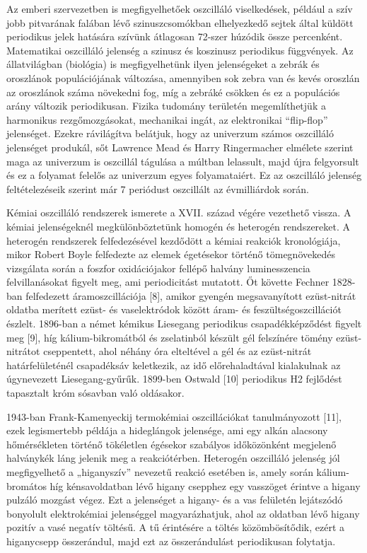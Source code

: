 Az emberi szervezetben is megfigyelhetőek oszcilláló viselkedések, például a szív jobb pitvarának falában lévő szinuszcsomókban elhelyezkedő sejtek által küldött periodikus jelek hatására  szívünk átlagosan 72-szer húzódik össze percenként. Matematikai oszcilláló jelenség a szinusz és koszinusz periodikus függvények. Az állatvilágban (biológia) is megfigyelhetünk ilyen jelenségeket a zebrák és oroszlánok populációjának változása, amennyiben sok zebra van és kevés oroszlán az oroszlánok száma növekedni fog, míg a zebráké csökken és ez a populációs arány változik periodikusan. Fizika tudomány területén megemlíthetjük a harmonikus rezgőmozgásokat, mechanikai ingát,  az elektronikai “flip-flop” jelenséget. Ezekre rávilágítva belátjuk, hogy az univerzum számos oszcilláló jelenséget produkál, sőt Lawrence Mead és Harry Ringermacher elmélete \cite{ringermacher2017strong}  szerint maga az univerzum is oszcillál tágulása a múltban lelassult, majd újra felgyorsult és ez a folyamat felelős az univerzum egyes folyamataiért. Ez az oszcilláló jelenség feltételezéseik szerint már 7 periódust oszcillált az évmilliárdok során.

Kémiai oszcilláló rendszerek ismerete a XVII. század végére vezethető vissza. A kémiai jelenségeknél megkülönböztetünk homogén és heterogén rendszereket. A heterogén rendszerek felfedezésével kezdődött a kémiai reakciók kronológiája, mikor Robert Boyle \cite{harvey1957history} felfedezte az elemek égetésekor történő tömegnövekedés vizsgálata során a foszfor oxidációjakor fellépő halvány luminesszencia felvillanásokat figyelt meg, ami periodicitást mutatott. Őt követte  Fechner 1828-ban felfedezett áramoszcillációja [8], amikor gyengén megsavanyított ezüst-nitrát oldatba merített ezüst- és vaselektródok között áram- és feszültségoszcillációt észlelt. 1896-ban a német kémikus Liesegang periodikus csapadékképződést figyelt meg [9], híg kálium-bikromátból és zselatinból készült gél felszínére tömény ezüst-nitrátot cseppentett, ahol néhány óra elteltével a gél és az ezüst-nitrát határfelületénél csapadéksáv keletkezik, az idő előrehaladtával kialakulnak az úgynevezett Liesegang-gyűrűk. 1899-ben Ostwald [10] periodikus H2 fejlődést tapasztalt króm sósavban való oldásakor.

1943-ban Frank-Kamenyeckij termokémiai oszcillációkat tanulmányozott [11], ezek legismertebb példája a hideglángok jelensége, ami egy alkán alacsony hőmérsékleten történő tökéletlen égésekor szabályos időközönként megjelenő halványkék láng jelenik meg a reakciótérben.
Heterogén oszcilláló jelenség jól megfigyelhető a „higanyszív” nevezetű reakció esetében is, amely során kálium-bromátos híg kénsavoldatban lévő higany csepphez egy vasszöget érintve a higany pulzáló mozgást végez. Ezt a jelenséget a higany- és a vas felületén lejátszódó bonyolult elektrokémiai jelenséggel magyarázhatjuk, ahol az oldatban lévő higany pozitív a vasé negatív töltésű. A tű érintésére a töltés közömbösítődik, ezért a higanycsepp összerándul, majd ezt az összerándulást periodikusan folytatja.


